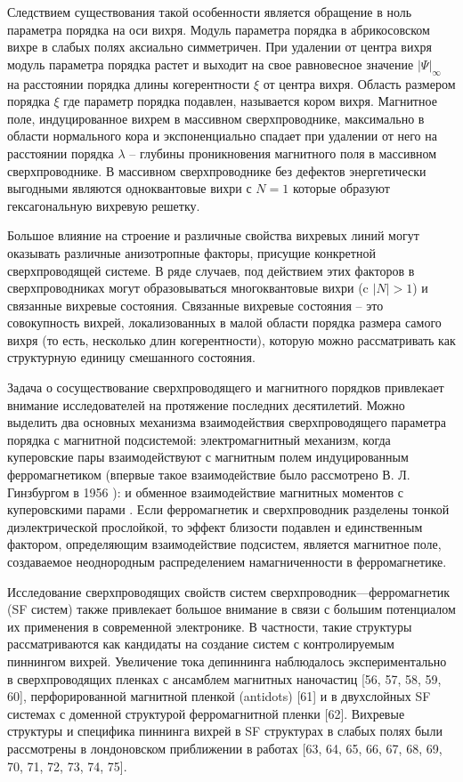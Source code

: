 Следствием существования такой особенности является обращение в ноль параметра 
порядка на оси вихря. Модуль параметра порядка в абрикосовском вихре в слабых 
полях аксиально симметричен. При удалении от центра вихря модуль параметра 
порядка растет и выходит на свое равновесное значение \( |\Psi|_\infty \) на 
расстоянии порядка длины когерентности \( \xi \) от центра вихря. Область 
размером порядка \( \xi \) где параметр порядка подавлен, называется кором 
вихря. Магнитное поле, индуцированное вихрем в массивном сверхпроводнике, 
максимально в области нормального кора и экспоненциально спадает при удалении 
от него на расстоянии порядка \( \lambda \) -- глубины проникновения магнитного 
поля в массивном сверхпроводнике. В массивном сверхпроводнике без дефектов 
энергетически выгодными являются одноквантовые вихри с \( N = 1 \) которые 
образуют гексагональную вихревую решетку.

Большое влияние на строение и различные свойства вихревых линий могут 
оказывать различные анизотропные факторы, присущие конкретной сверхпроводящей 
системе. В ряде случаев, под действием этих факторов в сверхпроводниках могут 
образовываться многоквантовые вихри (c \( |N|>1 \)) и связанные вихревые
состояния. Связанные вихревые состояния -- это совокупность вихрей, 
локализованных в малой области порядка размера самого вихря (то есть, 
несколько длин когерентности), которую можно рассматривать как структурную 
единицу смешанного состояния.

Задача о сосуществование сверхпроводящего и магнитного порядков привлекает 
внимание исследователей на протяжение последних десятилетий. Можно выделить 
два основных механизма взаимодействия сверхпроводящего параметра порядка с 
магнитной подсистемой: электромагнитный механизм, когда куперовские пары 
взаимодействуют с магнитным полем индуцированным ферромагнетиком (впервые 
такое взаимодействие было рассмотрено В. Л. Гинзбургом в 1956 
\cite{ginzburg}): и обменное взаимодействие магнитных моментов с куперовскими 
парами \cite{buzdin,bulaev}. Если ферромагнетик и сверхпроводник разделены 
тонкой диэлектрической прослойкой, то эффект близости подавлен и единственным 
фактором, определяющим взаимодействие подсистем, является магнитное поле, 
создаваемое неоднородным распределением намагниченности в ферромагнетике.

Исследование сверхпроводящих свойств систем сверхпроводник—ферромагнетик (SF 
систем) также привлекает большое внимание в связи с большим потенциалом их 
применения в современной электронике. В частности, такие структуры 
рассматриваются как кандидаты на создание систем с контролируемым пиннингом 
вихрей. Увеличение тока депиннинга наблюдалось экспериментально в 
сверхпроводящих пленках с ансамблем магнитных наночастиц [56, 57, 58, 59, 60], 
перфорированной магнитной пленкой (antidots) [61] и в двухслойных SF системах 
с доменной структурой ферромагнитной пленки [62]. Вихревые структуры и 
специфика пиннинга вихрей в SF структурах в слабых полях были рассмотрены в 
лондоновском приближении в работах 
[63, 64, 65, 66, 67, 68, 69, 70, 71, 72, 73, 74, 75].

